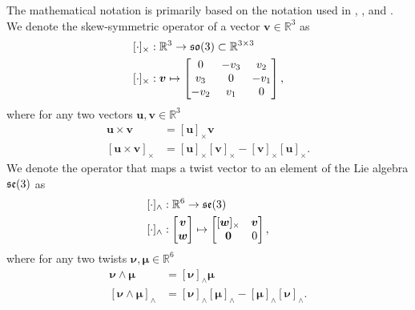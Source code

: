 The mathematical notation is primarily based on the notation used in \cite{modsim},
\cite{fossen2021}, and \cite{sola2017}. We denote the skew-symmetric operator
of a vector $\bm{v} \in \mathbb{R}^3$ as
\begin{subequations}
\begin{align}
    [\cdot]_{\times} &: \mathbb{R}^3 \to \mathfrak{so}(3) \subset \mathbb{R}^{3\times 3} \\
    [\cdot]_{\times} &: \bm{v} \mapsto 
    \begin{bmatrix}
        0 & -v_3 & v_2 \\
        v_3 & 0 & -v_1 \\
        -v_2 & v_1 & 0
    \end{bmatrix},
\end{align}
\end{subequations}
where for any two vectors $\bm{u}, \bm{v} \in \mathbb{R}^3$
\begin{subequations}
\begin{align}
    \bm{u} \times \bm{v} &= [\bm{u}]_{\times} \bm{v} \\
    [\bm{u} \times \bm{v}]_{\times} &=
    [\bm{u}]_{\times} [\bm{v}]_{\times} - [\bm{v}]_{\times} [\bm{u}]_{\times}. 
\end{align}
\end{subequations}
We denote the operator that maps a twist vector to an element of the Lie algebra
$\mathfrak{se}(3)$ as
\begin{subequations}
\begin{align}
    [\cdot]_{\wedge} &: \mathbb{R}^6 \to \mathfrak{se}(3) \\
    [\cdot]_{\wedge} &: \begin{bmatrix} \bm{v} \\ \bm{w} \end{bmatrix} \mapsto
        \begin{bmatrix}
            [\bm{w}]_{\times} & \bm{v} \\
            \bm{0} & 0
        \end{bmatrix},
\end{align}
\end{subequations}
where for any two twists $\bm{\nu}, \bm{\mu} \in \mathbb{R}^6$
\begin{subequations}
\begin{align}
    \bm{\nu} \wedge \bm{\mu} &= [\bm{\nu}]_{\wedge} \bm{\mu} \\
    [\bm{\nu} \wedge \bm{\mu}]_{\wedge} &=
    [\bm{\nu}]_{\wedge} [\bm{\mu}]_{\wedge} - [\bm{\mu}]_{\wedge} [\bm{\nu}]_{\wedge}. 
\end{align}
\end{subequations}
